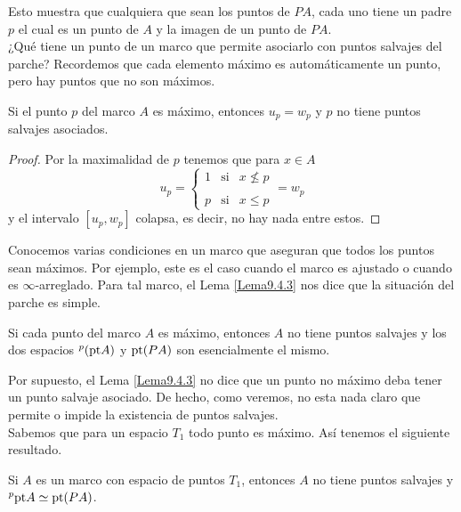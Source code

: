 Esto muestra que cualquiera que sean los puntos de $PA$, cada uno tiene un padre $p$ el cual es un punto de $A$ y la imagen de un punto de $PA$.\\

¿Qué tiene un punto de un marco que permite asociarlo con puntos salvajes del parche? Recordemos que cada elemento máximo es automáticamente un punto, pero hay puntos que no son máximos.

\begin{lem}\label{Lema9.4.3}
    Si el punto $p$ del marco $A$ es máximo, entonces $u_p=w_p$ y $p$ no tiene puntos salvajes asociados.
\end{lem}

\begin{proof}
    Por la maximalidad de $p$ tenemos que para $x\in A$
    \[
    u_p=\left\{ \begin{array}{lcc} 1 & \mbox{si} & x \nleq p\\ \\ 
    p & \mbox{si} & x\leq p  \end{array} \right.=w_p
    \]
    y el intervalo $[u_p, w_p]$ colapsa, es decir, no hay nada entre estos.
\end{proof}

Conocemos varias condiciones en un marco que aseguran que todos los puntos sean máximos. Por ejemplo, este es el caso cuando el marco es ajustado o cuando es $\infty$-arreglado. Para tal marco, el Lema \ref{Lema9.4.3} nos dice que la situación del parche es simple.

\begin{thm}\label{Teorema9.4.4}
    Si cada punto del marco $A$ es máximo, entonces $A$ no tiene puntos salvajes y los dos espacios $^p(\mathrm{pt} A)$ y $\mathrm{pt}(PA)$ son esencialmente el mismo.
\end{thm}

Por supuesto, el Lema \ref{Lema9.4.3} no dice que un punto no máximo deba tener un punto salvaje asociado. De hecho, como veremos, no esta nada claro que permite o impide la existencia de puntos salvajes.\\

Sabemos que para un espacio $T_1$ todo punto es máximo. Así tenemos el siguiente resultado.

\begin{cor}\label{Corolario9.4.5}
    Si $A$ es un marco con espacio de puntos $T_1$, entonces $A$ no tiene puntos salvajes y $^p\mathrm{pt} A\simeq \mathrm{pt} (PA)$.
\end{cor}


